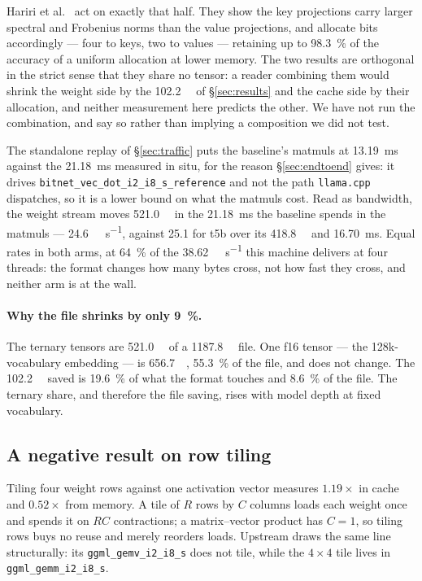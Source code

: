 \documentclass[11pt,a4paper]{article}
\newcommand{\code}[1]{\texttt{#1}}
\begin{document}
Hariri et al.~\cite{spectralkv} act on exactly that half. They show the key
projections carry larger spectral and Frobenius norms than the value
projections, and allocate bits accordingly --- four to keys, two to values ---
retaining up to \SI{98.3}{\percent} of the accuracy of a uniform allocation at
lower memory. The two results are orthogonal in the strict sense that they share
no tensor: a reader combining them would shrink the weight side by the
\SI{102.2}{\mega\byte} of \S\ref{sec:results} and the cache side by their
allocation, and neither measurement here predicts the other. We have not run the
combination, and say so rather than implying a composition we did not test.

The standalone replay of \S\ref{sec:traffic} puts the baseline's matmuls at
\SI{13.19}{\milli\second} against the \SI{21.18}{\milli\second} measured in
situ, for the reason \S\ref{sec:endtoend} gives: it drives
\code{bitnet\_\allowbreak vec\_\allowbreak dot\_\allowbreak i2\_\allowbreak i8\_\allowbreak s\_\allowbreak reference}
and not the path \code{llama.cpp} dispatches, so it is a lower bound on what the
matmuls cost. Read as bandwidth, the weight stream moves
\SI{521.0}{\mega\byte} in the \SI{21.18}{\milli\second} the baseline spends in
the matmuls --- \SI{24.6}{\giga\byte\per\second}, against \SI{25.1}{} for t5b
over its \SI{418.8}{\mega\byte} and \SI{16.70}{\milli\second}. Equal rates in
both arms, at \SI{64}{\percent} of the \SI{38.62}{\giga\byte\per\second} this
machine delivers at four threads: the format changes how many bytes cross, not
how fast they cross, and neither arm is at the wall.

\paragraph{Why the file shrinks by only \SI{9}{\percent}.} The ternary tensors
are \SI{521.0}{\mega\byte} of a \SI{1187.8}{\mega\byte} file. One f16 tensor ---
the 128k-vocabulary embedding --- is \SI{656.7}{\mega\byte}, \SI{55.3}{\percent}
of the file, and does not change. The \SI{102.2}{\mega\byte} saved is
\SI{19.6}{\percent} of what the format touches and \SI{8.6}{\percent} of the
file. The ternary share, and therefore the file saving, rises with model depth
at fixed vocabulary.

\subsection{A negative result on row tiling}
Tiling four weight rows against one activation vector measures $1.19\times$ in
cache and $0.52\times$ from memory. A tile of $R$ rows by $C$ columns loads each
weight once and spends it on $RC$ contractions; a matrix--vector product has
$C=1$, so tiling rows buys no reuse and merely reorders loads. Upstream draws
the same line structurally: its \code{ggml\_gemv\_i2\_i8\_s} does not tile,
while the $4\times 4$ tile lives in \code{ggml\_gemm\_i2\_i8\_s}.
\end{document}
